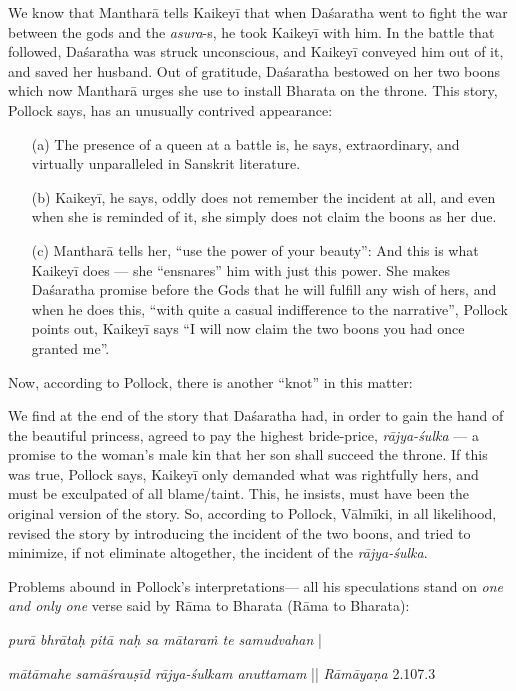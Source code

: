 We know that Mantharā tells Kaikeyī that when Daśaratha went to fight the war between the gods and the {\sl asura}-s, he took Kaikeyī with him. In the battle that followed, Daśaratha was struck unconscious, and Kaikeyī conveyed him out of it, and saved her husband. Out of gratitude, Daśaratha bestowed on her two boons which now Mantharā urges she use to install Bharata on the throne. This story, Pollock says, has an unusually contrived appearance:
\begin{itemize} 
\item[(a)] The presence of a queen at a battle is, he says, extraordinary, and virtually unparalleled in Sanskrit literature.  

\item[(b)] Kaikeyī, he says, oddly does not remember the incident at all, and even when she is reminded of it, she simply does not claim the boons as her due. 

\item[(c)] Mantharā tells her, “use the power of your beauty”: And this is what Kaikeyī does --- she “ensnares” him with just this power. She makes Daśaratha promise before the Gods that he will fulfill any wish of hers, and when he does this, “with quite a casual indifference to the narrative”, Pollock points out, Kaikeyī says “I will now claim the two boons you had once granted me”. 
\end{itemize}

Now, according to Pollock, there is another “knot” in this matter: 

We find at the end of the story that Daśaratha had, in order to gain the hand of the beautiful princess, agreed to pay the highest bride-price, {\sl rājya-śulka} --- a promise to the woman’s male kin that her son shall succeed the throne. If this was true, Pollock says, Kaikeyī only demanded what was rightfully hers, and must be exculpated of all blame/taint. This, he insists, must have been the original version of the story. So, according to Pollock, Vālmīki, in all likelihood, revised the story by introducing the incident of the two boons, and tried to minimize, if not eliminate altogether, the incident of the {\sl rājya-śulka}.

Problems abound in Pollock’s interpretations— all his speculations stand on {\sl one and only one} verse said by Rāma to Bharata (Rāma to Bharata): 

\begin{myquote}
{{\sl purā bhrātaḥ pitā naḥ sa mātaraṁ te samudvahan}} |

{\sl mātāmahe samāśrauṣīd rājya-śulkam anuttamam} || {\sl Rāmāyaṇa} 2.107.3
\end{myquote}

